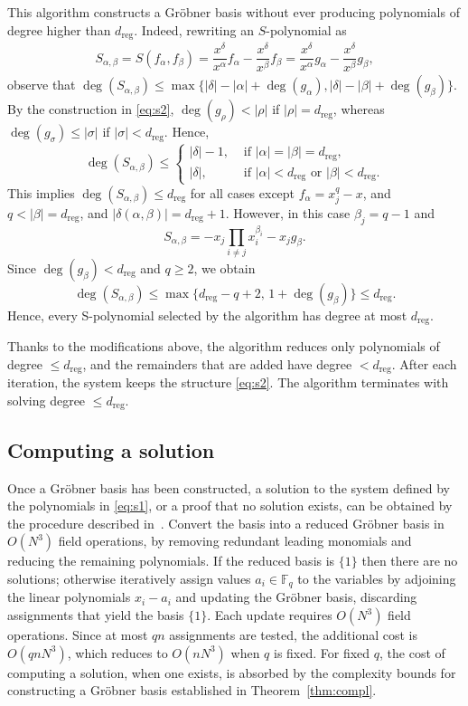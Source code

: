 \documentclass[a4paper, 12pt, oneside, openright]{article}
\begin{document}
This algorithm constructs a Gr\"{o}bner basis without ever producing polynomials of degree higher than $d_{\mathrm{reg}}$.
Indeed, rewriting an $S$-polynomial as
\begin{align}\label{eq:Spol}
   S_{\alpha,\beta}=S(f_\alpha,f_\beta)=\dfrac{x^\delta}{x^\alpha}f_\alpha - \dfrac{x^\delta}{x^\beta}f_\beta 
   =\dfrac{x^\delta}{x^\alpha}g_\alpha - \dfrac{x^\delta}{x^\beta}g_\beta,
\end{align}
observe that $\deg(S_{\alpha,\beta}) \le \max\{|\delta|-|\alpha|+\deg(g_\alpha), |\delta|-|\beta|+\deg(g_\beta)\}$. By the construction in \eqref{eq:s2}, $\deg(g_\rho)<|\rho|$ if $|\rho|=d_{\mathrm{reg}}$, whereas $\deg(g_\sigma) \le |\sigma|$ if $|\sigma|<d_{\mathrm{reg}}$. Hence,
\[\deg(S_{\alpha,\beta})\le
\begin{cases}
 |\delta| -1, &\text{ if } |\alpha|=|\beta|=d_{\mathrm{reg}},\\
 |\delta|, &\text{ if } |\alpha|<d_{\mathrm{reg}}  \text{ or } |\beta|<d_{\mathrm{reg}}.
\end{cases}
\]
This implies  $\deg(S_{\alpha,\beta})\le d_{\mathrm{reg}}$ for all cases except $f_{\alpha}=x_j^q-x$, and $q<|\beta|=d_{\mathrm{reg}}$, and $|\delta(\alpha,\beta)|=d_{\mathrm{reg}}+1$. However, in this case $\beta_j=q-1$ and
\[
S_{\alpha,\beta}=-x_j\prod_{i\ne j}x_i^{\beta_i}-x_jg_\beta.
\]
Since $\deg(g_\beta)<d_{\mathrm{reg}}$ and $q\ge 2$, we obtain
\[
\deg(S_{\alpha,\beta})\le
\max\{d_{\mathrm{reg}}-q+2,\,
1+\deg(g_\beta)\}
\le d_{\mathrm{reg}}.
\]
Hence, every S-polynomial selected by the algorithm has degree at most $d_{\mathrm{reg}}$.


Thanks to the modifications above,  the algorithm reduces only polynomials of degree  $\le d_{\mathrm{reg}}$, and the remainders that are added have degree  $<d_{\mathrm{reg}}$. After each iteration, the system keeps the structure \eqref{eq:s2}.
The algorithm terminates with solving degree $\le d_{\mathrm{reg}}.$


\subsection{Computing a solution}\label{sec:sol}
Once a Gr\"obner basis has been constructed, a solution to the system defined by the polynomials in \eqref{eq:s1}, or a proof that no solution exists, can be obtained by the procedure described in~\cite[Theorem 2.2]{ST}. Convert the basis into a reduced Gröbner basis in $O(N^3)$ field operations, by removing redundant leading monomials and reducing the remaining polynomials. If the reduced basis is $\{1\}$ then there are no solutions; otherwise iteratively assign values $a_i\in\mathbb F_q$ to the variables by adjoining the linear polynomials $x_i-a_i$ and updating the Gr\"obner basis, discarding assignments that yield the basis $\{1\}$. Each update requires $O(N^3)$ field operations. Since at most $qn$ assignments are tested, the additional cost is $O(qnN^3)$, which reduces to $O(nN^3)$ when $q$ is fixed.
For fixed $q$, the cost of computing a solution, when one exists, is absorbed by the complexity bounds for constructing a Gr\"{o}bner basis established in Theorem~\ref{thm:compl}.
\end{document}

